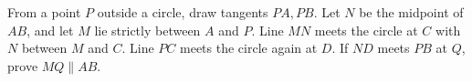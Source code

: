 From a point $P$ outside a circle, draw tangents $PA,PB$. Let $N$ be the midpoint of $AB$, and let $M$ lie strictly between $A$ and $P$. Line $MN$ meets the circle at $C$ with $N$ between $M$ and $C$. Line $PC$ meets the circle again at $D$. If $ND$ meets $PB$ at $Q$, prove $MQ\parallel AB$.
